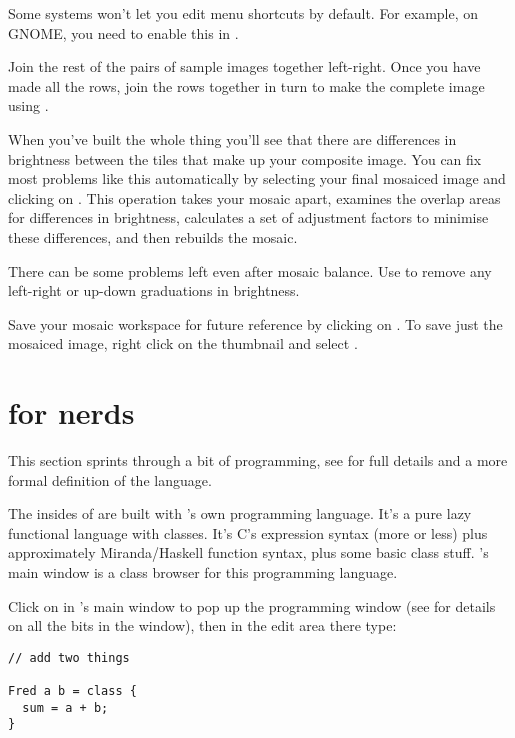 Some systems won't let you edit menu shortcuts by default. For example,
on GNOME, you need to enable this in .

Join the rest of the pairs of sample images together
left-right. Once you
have made all the rows, join the rows together in turn to make the complete
image using . 

When you've built the whole thing you'll see that there are differences
in brightness between the tiles that make up your composite image. You can
fix most problems like this automatically by selecting your final mosaiced
image and clicking on . This operation takes your
mosaic apart, examines the overlap areas for differences in brightness,
calculates a set of adjustment factors to minimise these differences,
and then rebuilds the mosaic.

There can be some problems left even after mosaic balance. Use
 to remove any left-right or up-down
graduations in brightness. 

Save your mosaic workspace for future reference by clicking on
. To save just the mosaiced image, right click
on the thumbnail and select .

\section{\nip{} for nerds}

This section sprints through a bit of \nip{} programming, see
 for full details and a more formal definition of the
language.

The insides of \nip{} are built with \nip{}'s own programming language. It's a
pure lazy functional language with classes. It's C's expression syntax
(more or less) plus approximately Miranda/Haskell function syntax,
plus some basic class stuff. \nip{}'s main window is a class browser for this
programming language.

Click on  in \nip{}'s main window to pop up the
programming window (see  for details on all the bits in the
window), then in the edit area there type:

\begin{verbatim}
// add two things
 
Fred a b = class {
  sum = a + b;
}
\end{verbatim}

